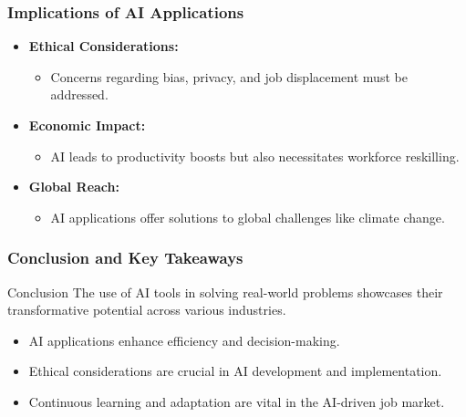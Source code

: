 \documentclass{beamer}
\begin{document}
\begin{frame}[fragile]
    \frametitle{Implications of AI Applications}
    \begin{itemize}
        \item \textbf{Ethical Considerations:} 
            \begin{itemize}
                \item Concerns regarding bias, privacy, and job displacement must be addressed.
            \end{itemize}
        \item \textbf{Economic Impact:} 
            \begin{itemize}
                \item AI leads to productivity boosts but also necessitates workforce reskilling.
            \end{itemize}
        \item \textbf{Global Reach:} 
            \begin{itemize}
                \item AI applications offer solutions to global challenges like climate change.
            \end{itemize}
    \end{itemize}
\end{frame}

\begin{frame}[fragile]
    \frametitle{Conclusion and Key Takeaways}
    \begin{block}{Conclusion}
        The use of AI tools in solving real-world problems showcases their transformative potential across various industries. 
    \end{block}
    \begin{itemize}
        \item AI applications enhance efficiency and decision-making.
        \item Ethical considerations are crucial in AI development and implementation.
        \item Continuous learning and adaptation are vital in the AI-driven job market.
    \end{itemize}
\end{frame}
\end{document}
